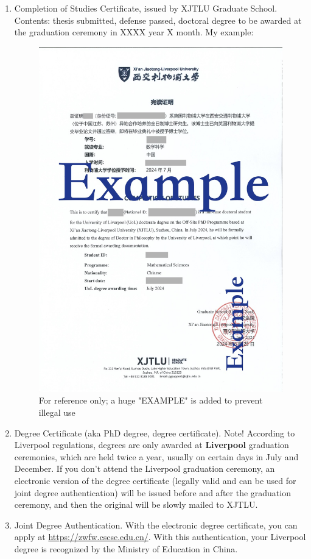 \begin{enumerate}
    \item Completion of Studies Certificate, issued by XJTLU Graduate School. Contents: thesis submitted, defense passed, doctoral degree to be awarded at the graduation ceremony in XXXX year X month. My example:
    \begin{figure}[H]
        \centering
        \includegraphics[width=0.8\columnwidth]{author-folder/Kai.Wu/Completion_of_Studies_Certificate_EXAMPLE.jpg}
        \caption{For reference only; a huge "EXAMPLE" is added to prevent illegal use}
    \end{figure}
    \item Degree Certificate (aka PhD degree, degree certificate). Note! According to Liverpool regulations, degrees are only awarded at \textbf{Liverpool} graduation ceremonies, which are held twice a year, usually on certain days in July and December. If you don't attend the Liverpool graduation ceremony, an electronic version of the degree certificate (legally valid and can be used for joint degree authentication) will be issued before and after the graduation ceremony, and then the original will be slowly mailed to XJTLU.
    \item Joint Degree Authentication. With the electronic degree certificate, you can apply at \url{https://zwfw.cscse.edu.cn/}. With this authentication, your Liverpool degree is recognized by the Ministry of Education in China.
\end{enumerate}

